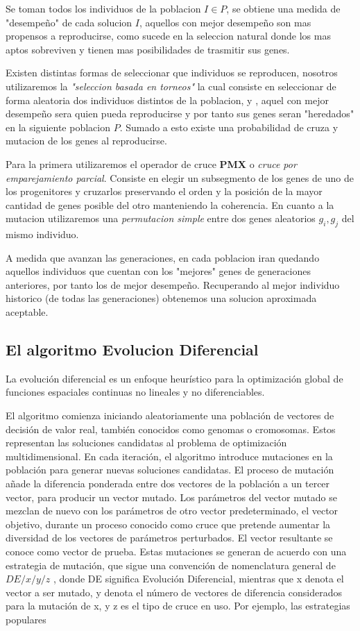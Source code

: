 \documentclass[10pt]{article}
\begin{document}
Se toman todos los individuos de la poblacion $I \in P$, se obtiene una medida de "desempeño" de cada solucion $I$, aquellos con mejor desempeño son mas propensos a reproducirse, como sucede en la seleccion natural donde los mas aptos sobreviven y tienen mas posibilidades de trasmitir sus genes.

Existen distintas formas de seleccionar que individuos se reproducen, nosotros utilizaremos la \textit{"seleccion basada en torneos"} la cual consiste en seleccionar de forma aleatoria dos individuos distintos de la poblacion, y , aquel con mejor desempeño sera quien pueda reproducirse y por tanto sus genes seran "heredados" en la siguiente poblacion $P$. Sumado a esto existe una probabilidad de cruza y mutacion de los genes al reproducirse.

Para la primera utilizaremos el operador de cruce \textbf{PMX} o \textit{cruce por emparejamiento parcial}. Consiste en elegir un subsegmento de los genes de uno de los progenitores y cruzarlos preservando el orden y la posición de la mayor cantidad de genes posible del otro manteniendo la coherencia.
En cuanto a la mutacion utilizaremos una \textit{permutacion simple} entre dos genes aleatorios $g_i,g_j$ del mismo individuo.

A medida que avanzan las generaciones, en cada poblacion iran quedando aquellos individuos que cuentan con los "mejores"  genes de generaciones anteriores, por tanto los de mejor desempeño. Recuperando al mejor individuo historico (de todas las generaciones) obtenemos una solucion aproximada aceptable.

\subsection{El algoritmo Evolucion Diferencial}

La evolución diferencial es un enfoque heurístico para la optimización global de funciones espaciales continuas no lineales y no diferenciables. 

El algoritmo comienza iniciando aleatoriamente una población de vectores de decisión de valor real, también conocidos como genomas o cromosomas. Estos representan las soluciones candidatas al problema de optimización multidimensional.\newline
En cada iteración, el algoritmo introduce mutaciones en la población para generar nuevas soluciones candidatas. El proceso de mutación añade la diferencia ponderada entre dos vectores de la población a un tercer vector, para producir un vector mutado. Los parámetros del vector mutado se mezclan de nuevo con los parámetros de otro vector predeterminado, el vector objetivo, durante un proceso conocido como cruce que pretende aumentar la diversidad de los vectores de parámetros perturbados. El vector resultante se conoce como vector de prueba.
Estas mutaciones se generan de acuerdo con una estrategia de mutación, que sigue una convención de nomenclatura general de $DE/x/y/z$ , donde DE significa Evolución Diferencial, mientras que x denota el vector a ser mutado, y denota el número de vectores de diferencia considerados para la mutación de x, y z es el tipo de cruce en uso. Por ejemplo, las estrategias populares
\end{document}
